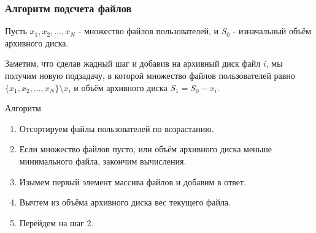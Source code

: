 \documentclass{beamer}
\begin{document}
\begin{frame}

    \frametitle{Алгоритм подсчета файлов}

    Пусть $x_1, x_2, ... , x_N$ - множество файлов пользователей, и $S_0$ - изначальный объём архивного диска.

    Заметим, что сделав жадный шаг и добавив на архивный диск файл $i$, мы получим новую подзадачу, в которой множество файлов пользователей равно $\{x_1, x_2, ... , x_N\} \setminus x_i$ и объём архивного диска $S_1 = S_0 - x_i$. 

    \pause

    \begin{alertblock}{Алгоритм}

        {\footnotesize

        \begin{enumerate}

            \item Отсортируем файлы пользователей по возрастанию.

            \item Если множество файлов пусто, или объём архивного диска меньше минимального файла, закончим вычисления.

            \item Изымем первый элемент массива файлов и добавим в ответ.

            \item Вычтем из объёма архивного диска вес текущего файла.

            \item Перейдем на шаг 2.

        \end{enumerate}
        
        }

    \end{alertblock}

\end{frame}
\end{document}
